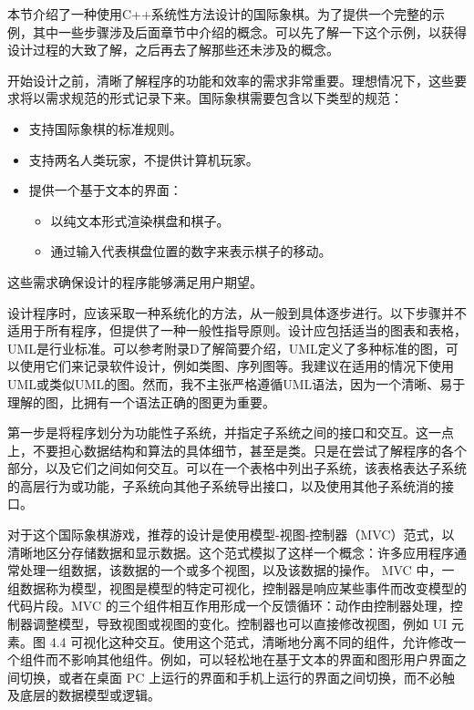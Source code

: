 
本节介绍了一种使用C++系统性方法设计的国际象棋。为了提供一个完整的示例，其中一些步骤涉及后面章节中介绍的概念。可以先了解一下这个示例，以获得设计过程的大致了解，之后再去了解那些还未涉及的概念。


开始设计之前，清晰了解程序的功能和效率的需求非常重要。理想情况下，这些要求将以需求规范的形式记录下来。国际象棋需要包含以下类型的规范：

\begin{itemize}
\item
支持国际象棋的标准规则。

\item
支持两名人类玩家，不提供计算机玩家。

\item
提供一个基于文本的界面：
\begin{itemize}
\item
以纯文本形式渲染棋盘和棋子。

\item
通过输入代表棋盘位置的数字来表示棋子的移动。
\end{itemize}
\end{itemize}

这些需求确保设计的程序能够满足用户期望。


设计程序时，应该采取一种系统化的方法，从一般到具体逐步进行。以下步骤并不适用于所有程序，但提供了一种一般性指导原则。设计应包括适当的图表和表格，UML是行业标准。可以参考附录D了解简要介绍，UML定义了多种标准的图，可以使用它们来记录软件设计，例如类图、序列图等。我建议在适用的情况下使用UML或类似UML的图。然而，我不主张严格遵循UML语法，因为一个清晰、易于理解的图，比拥有一个语法正确的图更为重要。


第一步是将程序划分为功能性子系统，并指定子系统之间的接口和交互。这一点上，不要担心数据结构和算法的具体细节，甚至是类。只是在尝试了解程序的各个部分，以及它们之间如何交互。可以在一个表格中列出子系统，该表格表达子系统的高层行为或功能，子系统向其他子系统导出接口，以及使用其他子系统消的接口。

对于这个国际象棋游戏，推荐的设计是使用模型-视图-控制器（MVC）范式，以清晰地区分存储数据和显示数据。这个范式模拟了这样一个概念：许多应用程序通常处理一组数据，该数据的一个或多个视图，以及该数据的操作。 MVC 中，一组数据称为模型，视图是模型的特定可视化，控制器是响应某些事件而改变模型的代码片段。MVC 的三个组件相互作用形成一个反馈循环：动作由控制器处理，控制器调整模型，导致视图或视图的变化。控制器也可以直接修改视图，例如 UI 元素。图 4.4 可视化这种交互。使用这个范式，清晰地分离不同的组件，允许修改一个组件而不影响其他组件。例如，可以轻松地在基于文本的界面和图形用户界面之间切换，或者在桌面 PC 上运行的界面和手机上运行的界面之间切换，而不必触及底层的数据模型或逻辑。

